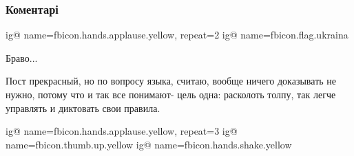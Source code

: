  
 
 
 
 
\subsubsection{Коментарі}
\label{sec:07_08_2021.fb.babikov_aleksandr.1.jazyk_zapret.cmt}

\begin{itemize}

\ifcmt
  ig@ name=fbicon.hands.applause.yellow, repeat=2
  ig@ name=fbicon.flag.ukraina
\fi

 
Браво...

 

Пост прекрасный, но по вопросу языка, считаю, вообще ничего доказывать не
нужно, потому что и так все понимают- цель одна: расколоть толпу, так легче
управлять и диктовать свои правила.


\ifcmt
  ig@ name=fbicon.hands.applause.yellow, repeat=3
  ig@ name=fbicon.thumb.up.yellow
  ig@ name=fbicon.hands.shake.yellow
\fi



\end{itemize}
